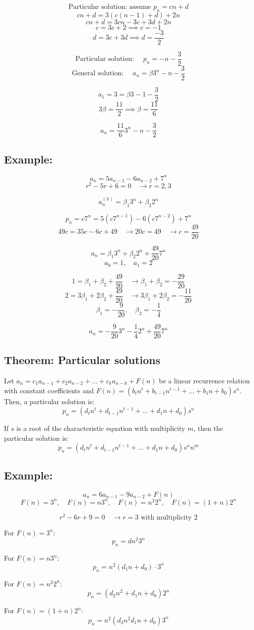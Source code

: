\documentclass[11pt]{article}
\begin{document}
\[
\text{Particular solution: assume } p_n = cn + d
\]
\[
cn + d = 3(c(n-1) + d) + 2n
\]
\[
cn + d = 3cn - 3c + 3d + 2n
\]
\[
c = 3c + 2 \implies c = -1
\]
\[
d = 3c + 3d \implies d = \frac{-3}{2}
\]

\[
\text{Particular solution: } \quad p_n = -n - \frac{3}{2}
\]
\[
\text{General solution: } \quad a_n = \beta 3^n - n - \frac{3}{2}
\]

\[
a_1 = 3 = \beta 3 - 1 - \frac{3}{2} 
\]
\[
3 \beta = \frac{11}{2} \implies \beta = \frac{11}{6}
\]

\[
a_n = \frac{11}{6} 3^n - n - \frac{3}{2}
\]

\subsection*{Example:}
\[
a_n = 5 a_{n-1} - 6 a_{n-2} + 7^n
\]
\[
r^2 - 5r + 6 = 0 \quad \rightarrow r = 2, 3
\]

\[
a_n^{(h)} = \beta_1 3^n + \beta_2 2^n
\]

\[
p_n = c 7^n = 5(c 7^{n-1}) - 6(c 7^{n-2}) + 7^n
\]
\[
49c = 35c - 6c + 49 \quad \rightarrow 20c = 49 \quad \rightarrow c = \frac{49}{20}
\]

\[
a_n = \beta_1 3^n + \beta_2 2^n + \frac{49}{20} 7^n
\]
\[
a_0 = 1, \quad a_1 = 2
\]

\[
1 = \beta_1 + \beta_2 + \frac{49}{20} \quad \rightarrow \beta_1 + \beta_2 = -\frac{29}{20}
\]
\[
2 = 3 \beta_1 + 2 \beta_2 + \frac{49}{20} \quad \rightarrow 3 \beta_1 + 2 \beta_2 = -\frac{11}{20}
\]
\[
\beta_1 = -\frac{9}{20}, \quad \beta_2 = -\frac{1}{4}
\]

\[
a_n = -\frac{9}{20} 3^n - \frac{1}{4} 2^n + \frac{49}{20} 7^n
\]

\subsection{Theorem: Particular solutions}
Let $a_n = c_1 a_{n-1} + c_2 a_{n-2} + \dots + c_k a_{n-k} + F(n)$ be a linear recurrence relation with constant coefficients and $F(n) = (b_t n^t + b_{t-1} n^{t-1} + \dots + b_1 n + b_0) s^n$.
Then, a particular solution is:
\[
p_n = (d_t n^t + d_{t-1} n^{t-1} + \dots + d_1 n + d_0) s^n
\]

If $s$ is a root of the characteristic equation with multiplicity $m$, then the particular solution is:
\[
p_n = (d_t n^t + d_{t-1} n^{t-1} + \dots + d_1 n + d_0) s^n n^m
\]

\subsection*{Example:}
\[
a_n = 6 a_{n-1} - 9 a_{n-2} + F(n)
\]
\[
F(n) = 3^n, \quad F(n) = n 3^n, \quad F(n) = n^2 2^n, \quad F(n) = (1 + n) 2^n
\]

\[
r^2 - 6r + 9 = 0 \quad \rightarrow r = 3 \text{ with multiplicity } 2
\]

For $F(n) = 3^n$:
\[
p_n = d n^2 3^n
\]

For $F(n) = n 3^n$:
\[
p_n = n^2 (d_1 n + d_0) \cdot 3^n
\]

For $F(n) = n^2 2^n$:
\[
p_n = (d_2 n^2 + d_1 n + d_0) 2^n
\]

For $F(n) = (1 + n) 2^n$:
\[
p_n = n^2 (d_2 n^2 d_1 n + d_0) 3^n
\]
\end{document}
